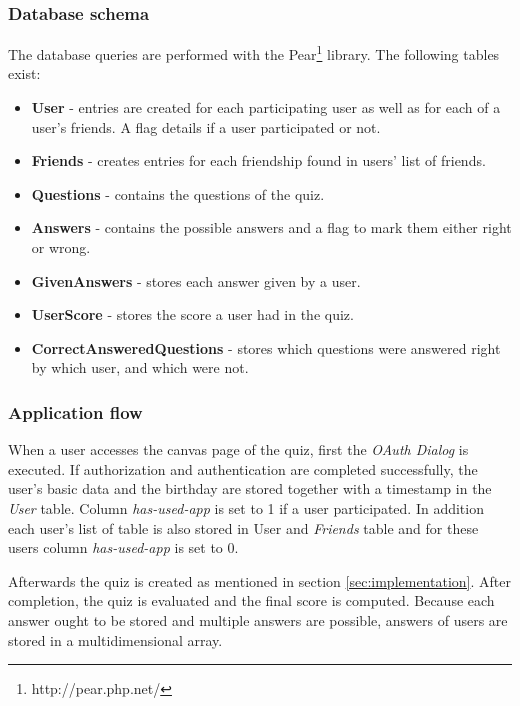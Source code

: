 \documentclass[preprint,12pt]{elsarticle}
\begin{document}
\subsubsection{Database schema}
\label{sec:database-schema}
The database queries are performed with the 
Pear\footnote{http://pear.php.net/} library. The following tables exist:
\begin{itemize}
\item \textbf{User} - entries are created for each participating user as
well as for each of a user's friends. A flag details if a user
participated or not.
\item \textbf{Friends} - creates entries for each friendship found in
users' list of friends.
\item \textbf{Questions} - contains the questions of the quiz.
\item \textbf{Answers} - contains the possible answers and a flag to mark them
either right or wrong.
\item \textbf{GivenAnswers} - stores each answer given by a user.
\item \textbf{UserScore} - stores the score a user had in the quiz.
\item \textbf{CorrectAnsweredQuestions} - stores which questions were
answered right by which user, and which were not.
\end{itemize}

\subsubsection{Application flow}
\label{sec:application-flow}
When a user accesses the canvas page of the quiz, first
the \textit{OAuth Dialog} is executed. 
If authorization and authentication are completed
successfully, the user's basic data and the birthday are stored together with
a timestamp in the \textit{User} table. Column \textit{has-used-app}
is set to 1 if a user participated. In
addition each user's list of table is also stored in \textup{User} and
\textit{Friends} table and for these users column
\textit{has-used-app} is set to 0. 

Afterwards the quiz is created as mentioned in section
\ref{sec:implementation}.
After completion, the quiz is evaluated and the final score is computed. Because
each answer ought to be stored and multiple answers are
possible, answers of users are stored in  a multidimensional array. 
\end{document}
